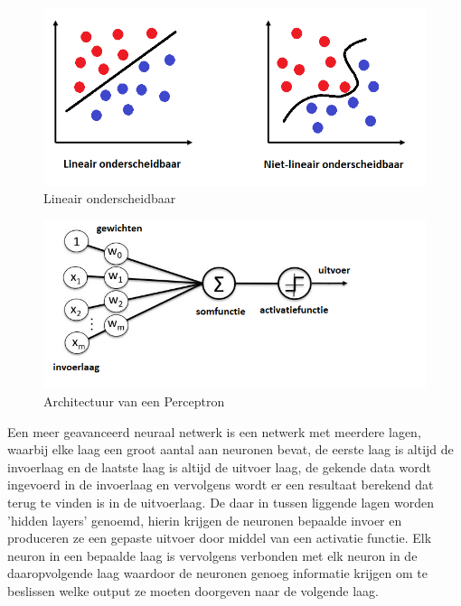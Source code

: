 \begin{figure}
	
	
	\includegraphics[width=\linewidth]{img/Lineair_onderscheidbaar.png}
	\caption{Lineair onderscheidbaar}
	
\end{figure}


\begin{figure}
	
	
	\includegraphics[width=\linewidth]{img/Perceptron.png}
	\caption{Architectuur van een Perceptron}
	
\end{figure}

Een meer geavanceerd neuraal netwerk is een netwerk met meerdere lagen, waarbij elke laag een groot aantal aan neuronen bevat, de eerste laag is altijd de invoerlaag en de laatste laag is altijd de uitvoer laag, de gekende data wordt ingevoerd in de invoerlaag en vervolgens wordt er een resultaat berekend dat terug te vinden is in de uitvoerlaag. De daar in tussen liggende lagen worden 'hidden layers' genoemd, hierin krijgen de neuronen bepaalde invoer en produceren ze een gepaste uitvoer door middel van een activatie functie.
Elk neuron in een bepaalde laag is vervolgens verbonden met elk neuron in de daaropvolgende laag waardoor de neuronen genoeg informatie krijgen om te beslissen welke output ze moeten doorgeven naar de volgende laag.

